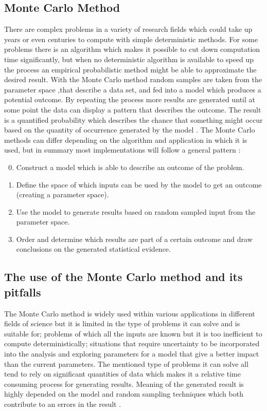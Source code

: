 \subsection{Monte Carlo Method}
There are complex problems in a variety of research fields which could take up years or even centuries to compute with simple deterministic methods. For some problems there is an algorithm which makes it possible to cut down computation time significantly, but when no deterministic algorithm is available to speed up the process an empirical probabilistic method might be able to approximate the desired result. With the Monte Carlo method random samples are taken from the parameter space ,that describe a data set, and fed into a model which produces a potential outcome. By repeating the process more results are generated until at some point the data can display a pattern that describes the outcome. The result is a quantified probability which describes the chance that something might occur based on the quantity of occurrence generated by the model \cite{}.
\newline
The Monte Carlo methods can differ depending on the algorithm and application in which it is used, but in summary most implementations will follow a general pattern \cite{}:
\begin{enumerate}
	\setcounter{enumi}{-1}
	\item Construct a model which is able to describe an outcome of the problem.
	\item Define the space of which inputs can be used by the model to get an outcome (creating a parameter space). 
	\item Use the model to generate results based on random sampled input from the parameter space.
	\item Order and determine which results are part of a certain outcome and draw conclusions on the generated statistical evidence.
\end{enumerate}

\label{subsec:Monte_Carlo_Method}

\subsection{The use of the Monte Carlo method and its pitfalls}
The Monte Carlo method is widely used within various applications in different fields of science but it is limited in the type of problems it can solve and is suitable for; problems of which all the inputs are known but it is too inefficient to compute deterministically; situations that require uncertainty to be incorporated into the analysis and exploring parameters for a model that give a better impact than the current parameters. The mentioned type of problems it can solve all tend to rely on significant quantities of data which makes it a relative time consuming process for generating results. Meaning of the generated result is highly depended on the model and random sampling techniques which both contribute to an errors in the result \cite{}.
